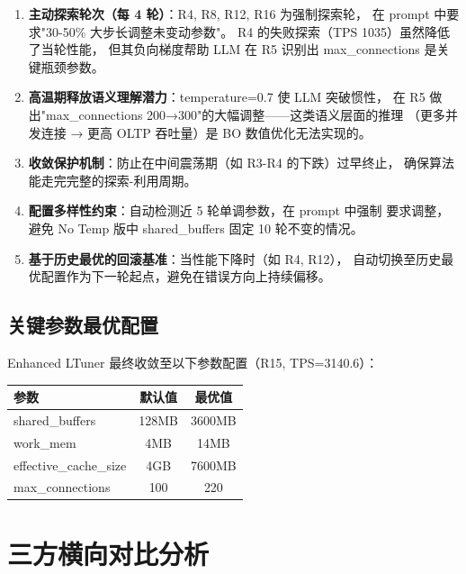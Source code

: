 \begin{enumerate}
  \item \textbf{主动探索轮次（每 4 轮）}：R4, R8, R12, R16 为强制探索轮，
        在 prompt 中要求"30-50\% 大步长调整未变动参数"。
        R4 的失败探索（TPS 1035）虽然降低了当轮性能，
        但其负向梯度帮助 LLM 在 R5 识别出 max\_connections 是关键瓶颈参数。
  \item \textbf{高温期释放语义理解潜力}：temperature=0.7 使 LLM 突破惯性，
        在 R5 做出"max\_connections 200→300"的大幅调整——这类语义层面的推理
       （更多并发连接 → 更高 OLTP 吞吐量）是 BO 数值优化无法实现的。
  \item \textbf{收敛保护机制}：防止在中间震荡期（如 R3-R4 的下跌）过早终止，
        确保算法能走完完整的探索-利用周期。
  \item \textbf{配置多样性约束}：自动检测近 5 轮单调参数，在 prompt 中强制
        要求调整，避免 No Temp 版中 shared\_buffers 固定 10 轮不变的情况。
  \item \textbf{基于历史最优的回滚基准}：当性能下降时（如 R4, R12），
        自动切换至历史最优配置作为下一轮起点，避免在错误方向上持续偏移。
\end{enumerate}

\subsection{关键参数最优配置}

Enhanced LTuner 最终收敛至以下参数配置（R15, TPS=3140.6）：

\begin{table}[h]
\centering
\begin{tabular}{l|c|c}
\hline
\textbf{参数} & \textbf{默认值} & \textbf{最优值} \\
\hline
shared\_buffers       & 128MB   & 3600MB  \\
work\_mem             & 4MB     & 14MB    \\
effective\_cache\_size & 4GB     & 7600MB  \\
max\_connections       & 100     & 220     \\
\hline
\end{tabular}
\end{table}



\section{三方横向对比分析}

